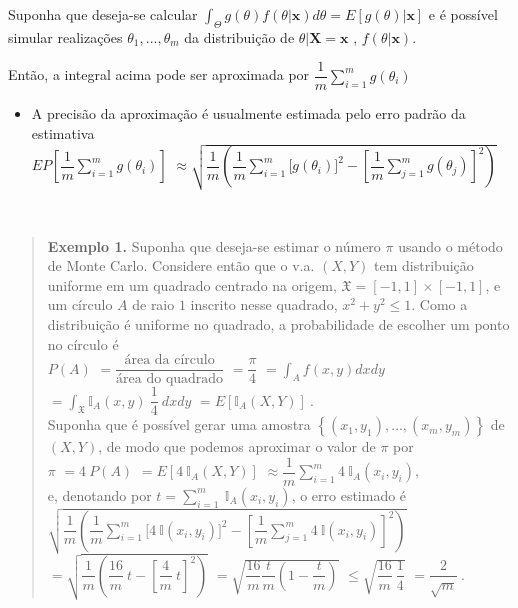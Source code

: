 \documentclass[
]{book}
\providecommand{\tightlist}{%
  \setlength{\itemsep}{0pt}\setlength{\parskip}{0pt}}
\begin{document}
Suponha que deseja-se calcular \(\displaystyle\int_\Theta g(\theta)f(\theta|\boldsymbol x)d\theta=E\left[g(\theta)|\boldsymbol x\right]\) e é possível simular realizações \(\theta_1,...,\theta_m\) da distribuição de \(\theta |\boldsymbol X=\boldsymbol x\) , \(f(\theta | \boldsymbol x)\).

Então, a integral acima pode ser aproximada por \(\displaystyle \dfrac{1}{m}\sum_{i=1}^m g(\theta_i)\)

\begin{itemize}
\tightlist
\item
  A precisão da aproximação é usualmente estimada pelo erro padrão da estimativa\\
  \(\displaystyle EP\left[\dfrac{1}{m}\sum_{i=1}^m g(\theta_i)\right]\)
  \(\approx \displaystyle \sqrt{\dfrac{1}{m}\left(\dfrac{1}{m}\sum_{i=1}^m\Big[g(\theta_i)\Big]^2-\left[\dfrac{1}{m}\sum_{j=1}^mg(\theta_j)\right]^2\right)}\)
\end{itemize}

\(~\)

\begin{quote}
\textbf{Exemplo 1.} Suponha que deseja-se estimar o número \(\pi\) usando o método de Monte Carlo. Considere então que o v.a. \((X,Y)\) tem distribuição uniforme em um quadrado centrado na origem, \(\mathfrak{X}=[-1,1]\times[-1,1]\), e um círculo \(A\) de raio \(1\) inscrito nesse quadrado, \(x^2+y^2\leq 1.\) Como a distribuição é uniforme no quadrado, a probabilidade de escolher um ponto no círculo é\\
\(P(A)\) \(=\dfrac{\text{área da círculo}}{\text{área do quadrado}}\) \(=\dfrac{\pi}{4}\) \(= \displaystyle\int_A f(x,y) dxdy\) \(= \displaystyle\int_{\mathfrak{X}} \mathbb{I}_A(x,y)~\dfrac{1}{4}~dxdy\) \(=E\left[\mathbb{I}_A(X,Y)\right]~.\)\\
Suponha que é possível gerar uma amostra \(\left\{(x_1,y_1),\ldots,(x_m,y_m)\right\}\) de \((X,Y)\), de modo que podemos aproximar o valor de \(\pi\) por\\
\(\pi\) \(=4~P(A)\) \(=E\left[4~\mathbb{I}_A(X,Y)\right]\) \(\displaystyle \approx \dfrac{1}{m}\sum_{i=1}^m 4~\mathbb{I}_A(x_i,y_i)\),\\
e, denotando por \(\displaystyle t=\sum_{i=1}^m ~\mathbb{I}_A(x_i,y_i)\), o erro estimado é\\
\(\displaystyle \sqrt{\dfrac{1}{m}\left(\dfrac{1}{m}\sum_{i=1}^m\Big[4~\mathbb{I}(x_i,y_i)\Big]^2-\left[\dfrac{1}{m}\sum_{j=1}^m 4~\mathbb{I}(x_i,y_i)\right]^2\right)}\)
\(=\displaystyle \sqrt{\dfrac{1}{m}\left(\dfrac{16}{m}~t-\left[\dfrac{4}{m}~t\right]^2\right)}\)
\(= \displaystyle \sqrt{\dfrac{16}{m} \dfrac{t}{m}\left(1-\dfrac{t}{m}\right)}\)
\(\leq \displaystyle \sqrt{\dfrac{16}{m}~\dfrac{1}{4}}\)
\(= \dfrac{2}{\sqrt{m}}~.\)
\end{quote}
\end{document}
